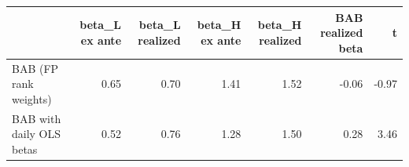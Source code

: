 \begin{tabular}{lrrrrrr}
\toprule
 & beta\_L ex ante & beta\_L realized & beta\_H ex ante & beta\_H realized & BAB realized beta & t \\
\midrule
BAB (FP rank weights) & 0.65 & 0.70 & 1.41 & 1.52 & -0.06 & -0.97 \\
BAB with daily OLS betas & 0.52 & 0.76 & 1.28 & 1.50 & 0.28 & 3.46 \\
\bottomrule
\end{tabular}
